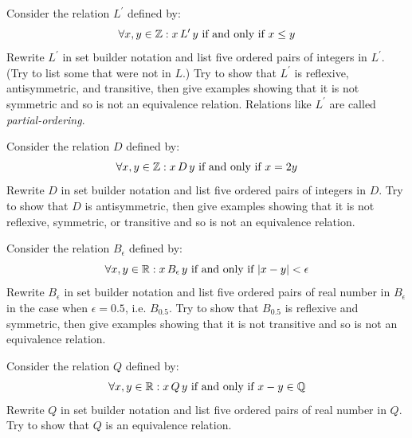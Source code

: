 \clearpage

\begin{practiceprob}
    Consider the relation \(L^\prime\) defined by:
    \begin{equation*}
        \forall x,y\in\mbox{$\mathbb{Z}$}: x\, L^\prime\, y\ \text{if and only if}\ x\leq y
    \end{equation*}
    Rewrite \(L^\prime\) in set builder notation and list five ordered pairs of integers in \(L^\prime\). (Try to list some that were not in \(L\).)  Try to show that \(L^\prime\) is reflexive, antisymmetric, and transitive, then give examples showing that it is not symmetric and so is not an equivalence relation.  Relations like \(L^\prime\) are called \emph{partial-ordering}.
    \vspace{0.3\textheight}
\end{practiceprob}

\begin{practiceprob}
    Consider the relation \(D\) defined by:
    \begin{equation*}
        \forall x,y\in\bbZ: x\, D\, y\ \text{if and only if}\ x=2y
    \end{equation*}
    Rewrite \(D\) in set builder notation and list five ordered pairs of integers in \(D\).  Try to show that \(D\) is antisymmetric, then give examples showing that it is not reflexive, symmetric, or transitive and so is not an equivalence relation.
    \vspace{0.3\textheight}
\end{practiceprob}

\clearpage

\begin{practiceprob}
    Consider the relation \(B_\epsilon\) defined by:
    \begin{equation*}
        \forall x,y\in\mbox{$\mathbb{R}$}: x\, B_\epsilon\, y\ \text{if and only if}\ |x-y|<\epsilon
    \end{equation*}
    Rewrite \(B_\epsilon\) in set builder notation and list five ordered pairs of real number in \(B_\epsilon\) in the case when \(\epsilon=0.5\), i.e. \(B_{0.5}\).  Try to show that \(B_{0.5}\) is reflexive and symmetric, then give examples showing that it is not transitive and so is not an equivalence relation.
    \vspace{0.3\textheight}
\end{practiceprob}

\begin{practiceprob}\label{prob:rational_rel}
    Consider the relation \(Q\) defined by:
    \begin{equation*}
        \forall x,y\in\bbR: x\, Q\, y\ \text{if and only if}\ x-y\in\bbQ
    \end{equation*}
    Rewrite \(Q\) in set builder notation and list five ordered pairs of real number in \(Q\).  Try to show that \(Q\) is an equivalence relation.
    \vspace{0.3\textheight}
\end{practiceprob}

